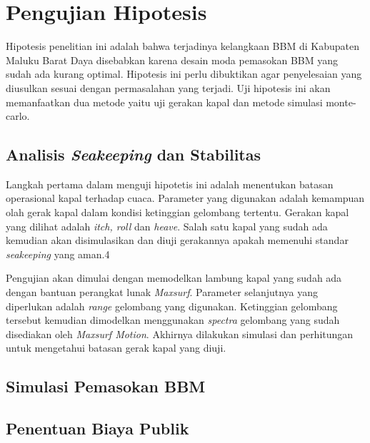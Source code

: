 \section{Pengujian Hipotesis}
\label{sec:uji-hipotesis}

Hipotesis penelitian ini adalah bahwa terjadinya kelangkaan BBM di Kabupaten Maluku Barat Daya disebabkan karena desain moda pemasokan BBM yang sudah ada kurang optimal. Hipotesis ini perlu dibuktikan agar penyelesaian yang diusulkan sesuai dengan permasalahan yang terjadi. Uji hipotesis ini akan memanfaatkan dua metode yaitu uji gerakan kapal dan metode simulasi monte-carlo.

\subsection{Analisis \emph{Seakeeping} dan Stabilitas}
\label{subsec:analisis-seakeeping}

Langkah pertama dalam menguji hipotetis ini adalah menentukan batasan operasional kapal terhadap cuaca. Parameter yang digunakan adalah kemampuan olah gerak kapal dalam kondisi ketinggian gelombang tertentu. Gerakan kapal yang dilihat adalah \textit{itch, roll} dan \emph{heave}. Salah satu kapal yang sudah ada kemudian akan disimulasikan dan diuji gerakannya apakah memenuhi standar \emph{seakeeping} yang aman.4

Pengujian akan dimulai dengan memodelkan lambung kapal yang sudah ada dengan bantuan perangkat lunak \emph{Maxsurf}. Parameter selanjutnya yang diperlukan adalah \emph{range} gelombang yang digunakan. Ketinggian gelombang tersebut kemudian dimodelkan menggunakan \emph{spectra} gelombang yang sudah disediakan oleh \emph{Maxsurf Motion}. Akhirnya dilakukan simulasi dan perhitungan untuk mengetahui batasan gerak kapal yang diuji.

\subsection{Simulasi Pemasokan BBM}
\label{subsec:metode-simul-bbm}


\subsection{Penentuan Biaya Publik}
\label{subsec:awal-biaya-publik}
